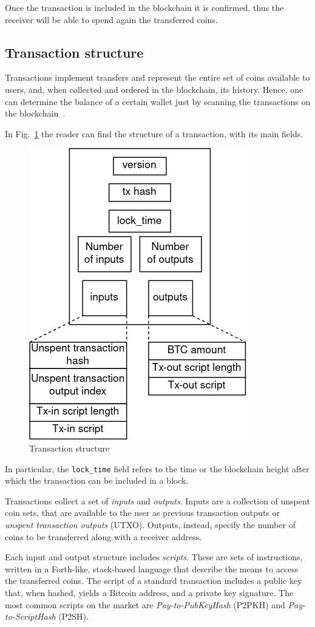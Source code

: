 \documentclass[12pt, letterpaper, twoside]{article}
\begin{document}
Once the transaction is included in the blockchain it is confirmed, thus the receiver will be able to spend again the transferred coins.

\subsection{Transaction structure}\label{sec:tx}
Transactions implement transfers and represent the entire set of coins available to users, and, when collected and ordered in the blockchain, its history. Hence, one can determine the balance of a certain wallet just by scanning the transactions on the blockchain~\cite{tschorsch-intro-survey}.

In Fig.~\ref{fig:tx} the reader can find the structure of a transaction, with its main fields.

\begin{figure}[h]
	\includegraphics[width=.40\textwidth]{pict/txstruct.png}
	\centering
	\caption{Transaction structure}
	\label{fig:tx}
\end{figure}

In particular, the \texttt{lock\_time} field refers to the time or the blockchain height after which the transaction can be included in a block.

Transactions collect a set of \emph{inputs} and \emph{outputs}. Inputs are a collection of unspent coin sets, that are available to the user as previous transaction outputs or \textit{unspent transaction outputs} (UTXO). Outputs, instead, specify the number of coins to be transferred along with a receiver address.

Each input and output structure includes \emph{scripts}. These are sets of instructions, written in a Forth-like, stack-based language that describe the means to access the transferred coins. The script of a standard transaction includes a public key that, when hashed, yields a Bitcoin address, and a private key signature. The most common scripts on the market are \emph{Pay-to-PubKeyHash} (P2PKH) and \emph{Pay-to-ScriptHash} (P2SH).
\end{document}
